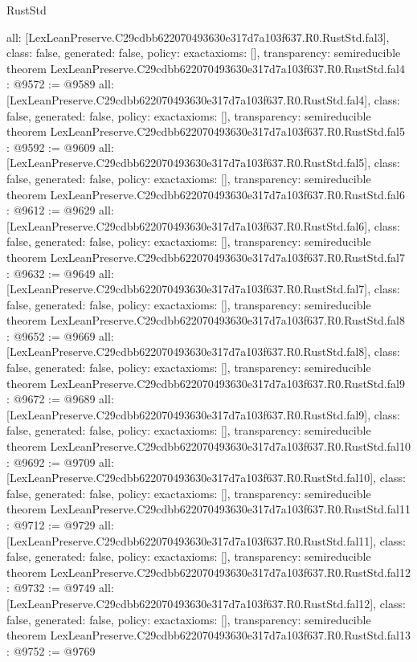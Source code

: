 \begin{lexlean}{RustStd}
\begin{coremodule}
{  all: [LexLeanPreserve.C29cdbb622070493630e317d7a103f637.R0.RustStd.fal3],
  class: false,
  generated: false,
  policy: exact{axioms: []},
  transparency: semireducible
}
theorem LexLeanPreserve.C29cdbb622070493630e317d7a103f637.R0.RustStd.fal4 : @9572 := @9589 {
  all: [LexLeanPreserve.C29cdbb622070493630e317d7a103f637.R0.RustStd.fal4],
  class: false,
  generated: false,
  policy: exact{axioms: []},
  transparency: semireducible
}
theorem LexLeanPreserve.C29cdbb622070493630e317d7a103f637.R0.RustStd.fal5 : @9592 := @9609 {
  all: [LexLeanPreserve.C29cdbb622070493630e317d7a103f637.R0.RustStd.fal5],
  class: false,
  generated: false,
  policy: exact{axioms: []},
  transparency: semireducible
}
theorem LexLeanPreserve.C29cdbb622070493630e317d7a103f637.R0.RustStd.fal6 : @9612 := @9629 {
  all: [LexLeanPreserve.C29cdbb622070493630e317d7a103f637.R0.RustStd.fal6],
  class: false,
  generated: false,
  policy: exact{axioms: []},
  transparency: semireducible
}
theorem LexLeanPreserve.C29cdbb622070493630e317d7a103f637.R0.RustStd.fal7 : @9632 := @9649 {
  all: [LexLeanPreserve.C29cdbb622070493630e317d7a103f637.R0.RustStd.fal7],
  class: false,
  generated: false,
  policy: exact{axioms: []},
  transparency: semireducible
}
theorem LexLeanPreserve.C29cdbb622070493630e317d7a103f637.R0.RustStd.fal8 : @9652 := @9669 {
  all: [LexLeanPreserve.C29cdbb622070493630e317d7a103f637.R0.RustStd.fal8],
  class: false,
  generated: false,
  policy: exact{axioms: []},
  transparency: semireducible
}
theorem LexLeanPreserve.C29cdbb622070493630e317d7a103f637.R0.RustStd.fal9 : @9672 := @9689 {
  all: [LexLeanPreserve.C29cdbb622070493630e317d7a103f637.R0.RustStd.fal9],
  class: false,
  generated: false,
  policy: exact{axioms: []},
  transparency: semireducible
}
theorem LexLeanPreserve.C29cdbb622070493630e317d7a103f637.R0.RustStd.fal10 : @9692 := @9709 {
  all: [LexLeanPreserve.C29cdbb622070493630e317d7a103f637.R0.RustStd.fal10],
  class: false,
  generated: false,
  policy: exact{axioms: []},
  transparency: semireducible
}
theorem LexLeanPreserve.C29cdbb622070493630e317d7a103f637.R0.RustStd.fal11 : @9712 := @9729 {
  all: [LexLeanPreserve.C29cdbb622070493630e317d7a103f637.R0.RustStd.fal11],
  class: false,
  generated: false,
  policy: exact{axioms: []},
  transparency: semireducible
}
theorem LexLeanPreserve.C29cdbb622070493630e317d7a103f637.R0.RustStd.fal12 : @9732 := @9749 {
  all: [LexLeanPreserve.C29cdbb622070493630e317d7a103f637.R0.RustStd.fal12],
  class: false,
  generated: false,
  policy: exact{axioms: []},
  transparency: semireducible
}
theorem LexLeanPreserve.C29cdbb622070493630e317d7a103f637.R0.RustStd.fal13 : @9752 := @9769 {
}
\end{coremodule}
\end{lexlean}
